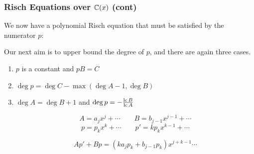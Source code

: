 \documentclass[aspectratio=169,dvipsnames]{beamer}
\newcommand{\lc}{{\rm lc\,}}
\begin{document}
\begin{frame}[fragile]
\small
\frametitle{Risch Equations over $\mathbb{C}(x)$ (cont)}

We now have a polynomial Risch equation
that must be satisfied by the numerator $p$:


Our next aim is to upper bound the degree of $p$, and there are again three cases.

\begin{enumerate}
\item $p$ is a constant and $pB = C$
\item $\deg p = \deg C - \max(\deg A - 1, \deg B)$
\item $\deg A = \deg B + 1$ and $\deg p =-\frac{\lc B}{\lc A} $

$$A = a_j x^j + \cdots \qquad B = b_{j-1} x^{j-1} + \cdots$$
$$p = p_k x^k + \cdots \qquad p' = k p_k x^{k-1} + \cdots$$

$$A p' + B p = (k a_j p_k + b_{j-1} p_k) x^{j+k-1} \cdots$$

\end{enumerate}

\end{frame}
\end{document}
